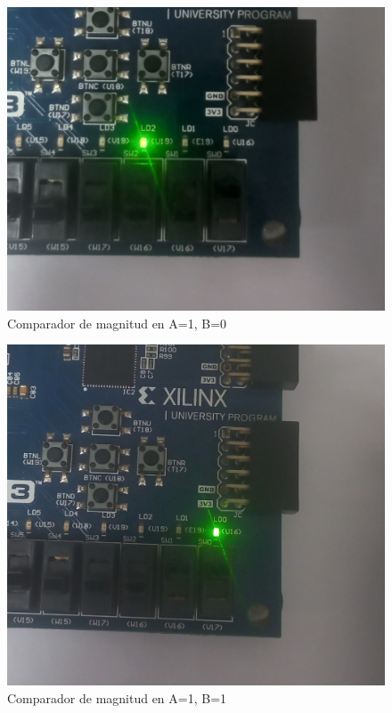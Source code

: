 \documentclass[12pt]{article}  %
\begin{document}
\begin{figure}[!ht]
    \centering
    \caption{Comparador de magnitud en A=1, B=0}
    \includegraphics[width=0.5\linewidth]{simulations/magnitud-comp/comp-mag-10.jpg}
\end{figure}
\begin{figure}[!ht]
    \centering
    \caption{Comparador de magnitud en A=1, B=1}
    \includegraphics[width=0.5\linewidth]{simulations/magnitud-comp/comp.mag-11.jpg}
\end{figure}
\newpage
\end{document}
